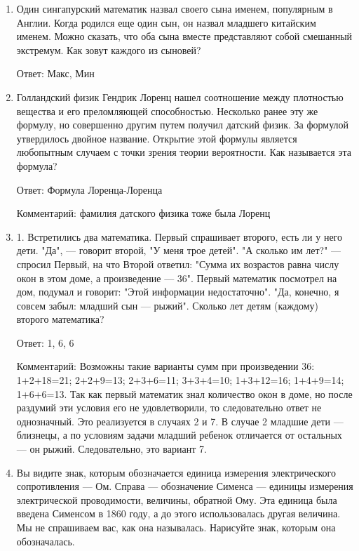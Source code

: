 \documentclass[oneside,final,14pt]{extreport}
\begin{document}
\begin{enumerate}
    Комментарий: Если бы дирижабль или самолет висел прямо над палубой на малой высоте, винты создавали бы мощный поток воздуха, который раздувал бы одежду и волосы людей. На фото люди стояли со спокойными прическами, значит, снимок смонтирован.

    \item Один сингапурский математик назвал своего сына именем, популярным в Англии. Когда родился еще один сын, он назвал младшего китайским именем. Можно сказать, что оба сына вместе представляют собой смешанный экстремум. Как зовут каждого из сыновей?

    Ответ: Макс, Мин

    \item Голландский физик Гендрик Лоренц нашел соотношение между плотностью вещества и его преломляющей способностью. Несколько ранее эту же формулу, но совершенно другим путем получил датский физик. За формулой утвердилось двойное название. Открытие этой формулы является любопытным случаем с точки зрения теории вероятности. Как называется эта формула?

    Ответ: Формула Лоренца-Лоренца

    Комментарий: фамилия датского физика тоже была Лоренц

    \item 1. Встретились два математика. Первый спрашивает второго, есть ли у него дети. "Да", — говорит второй, "У меня трое детей". "А сколько им лет?" — спросил Первый, на что Второй ответил: "Сумма их возрастов равна числу окон в этом доме, а произведение — 36". Первый математик посмотрел на дом, подумал и говорит: "Этой информации недостаточно". "Да, конечно, я совсем забыл: младший сын — рыжий". Сколько лет детям (каждому) второго математика?

    Ответ: 1, 6, 6

    Комментарий: Возможны такие варианты сумм при произведении 36: 1+2+18=21; 2+2+9=13; 2+3+6=11; 3+3+4=10; 1+3+12=16; 1+4+9=14; 1+6+6=13. Так как первый математик знал количество окон в доме, но после раздумий эти условия его не удовлетворили, то следовательно ответ не однозначный. Это реализуется в случаях 2 и 7. В случае 2 младшие дети — близнецы, а по условиям задачи младший ребенок отличается от остальных — он рыжий. Следовательно, это вариант 7.

    \item Вы видите знак, которым обозначается единица измерения электрического сопротивления — Ом. Справа — обозначение Сименса — единицы измерения электрической проводимости, величины, обратной Ому. Эта единица была введена Сименсом в 1860 году, а до этого использовалась другая величина. Мы не спрашиваем вас, как она называлась. Нарисуйте знак, которым она обозначалась.


\end{enumerate}
\end{document}
